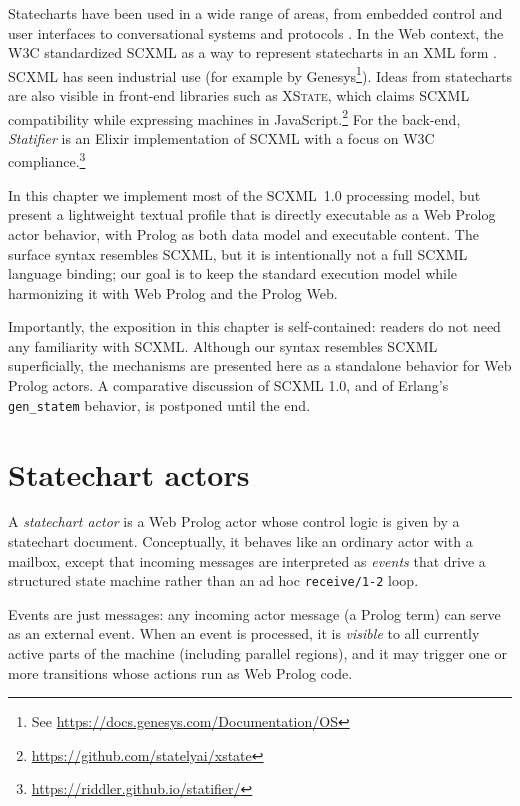 Statecharts have been used in a wide range of areas, from embedded control and user interfaces to conversational systems and protocols \cite{samek2002practical,horrocks1999constructing,DBLP:conf/icmi/SkantzeM12,DBLP:conf/ecms/CicirelliFGN09a}. In the Web context, the W3C standardized SCXML as a way to represent statecharts in an XML form \cite{barnett2015state}. SCXML has seen industrial use (for example by Genesys\footnote{See \url{https://docs.genesys.com/Documentation/OS}}). Ideas from statecharts are also visible in front-end libraries such as \textsc{XState}, which claims SCXML compatibility while expressing machines in JavaScript.\footnote{\url{https://github.com/statelyai/xstate}} For the back-end, \textit{Statifier} is an Elixir implementation of SCXML with a focus on W3C compliance.\footnote{\url{https://riddler.github.io/statifier/}} 

In this chapter we implement most of the SCXML~1.0 processing model, but present a lightweight textual profile that is directly executable as a Web Prolog actor behavior, with Prolog as both data model and executable content. The surface syntax resembles SCXML, but it is intentionally not a full SCXML language binding; our goal is to keep the standard execution model while harmonizing it with Web Prolog and the Prolog Web.

Importantly, the exposition in this chapter is self-contained: readers do not need any familiarity with SCXML. Although our syntax resembles SCXML superficially, the mechanisms are presented here as a standalone behavior for Web Prolog actors. A comparative discussion of SCXML 1.0, and of Erlang's \texttt{gen\_statem} behavior, is postponed until the end.

\section{Statechart actors}
\label{sec:statechart-actors-behavior}

A \emph{statechart actor} is a Web Prolog actor whose control logic is given by a statechart document. Conceptually, it behaves like an ordinary actor with a mailbox, except that incoming messages are interpreted as \emph{events} that drive a structured state machine rather than an ad hoc \texttt{receive/1-2} loop.

Events are just messages: any incoming actor message (a Prolog term) can serve as an external event. When an event is processed, it is \emph{visible} to all currently active parts of the machine (including parallel regions), and it may trigger one or more transitions whose actions run as Web Prolog code.

